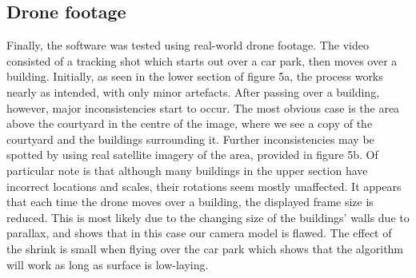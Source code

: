 \subsection{Drone footage}

Finally, the software was tested using real-world drone footage.
The video consisted of a tracking shot which starts out over a car park, then moves over a building.
Initially, as seen in the lower section of figure 5a, the process works nearly as intended,
with only minor artefacts.
After passing over a building, however, major inconsistencies start to occur.
The most obvious case is the area above the courtyard in the centre of the image,
where we see a copy of the courtyard and the buildings surrounding it.
Further inconsistencies may be spotted by using real satellite imagery of the area, provided in figure 5b.
Of particular note is that although many buildings in the upper section have incorrect locations and scales,
their rotations seem mostly unaffected.
It appears that each time the drone moves over a building, the displayed frame size is reduced.
This is most likely due to the changing size of the buildings' walls due to parallax, and shows that in this case our camera model is flawed.
The effect of the shrink is small when flying over the car park which shows that the algorithm will work as long as surface is low-laying.
